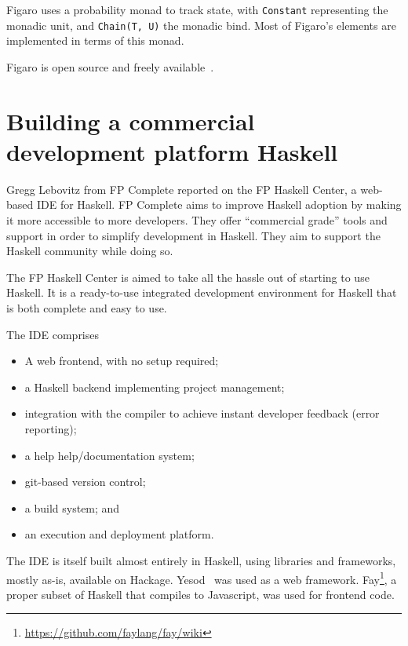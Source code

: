 \documentclass{jfp1}
\begin{document}
Figaro uses a probability monad to track state, with \texttt{Constant}
representing the monadic unit, and \texttt{Chain(T, U)} the monadic
bind. Most of Figaro's elements are implemented in terms of this monad.

Figaro is open source and freely available~\cite{CRA:2014:Figaro}.

\section{Building a commercial development platform Haskell}


Gregg Lebovitz from FP Complete reported on the FP Haskell Center, 
a web-based IDE for Haskell.  FP Complete aims to improve Haskell
adoption by making it more accessible to more developers. They offer
``commercial grade'' tools and support in order to simplify development
in Haskell. They aim to support the Haskell community while doing so.

The FP Haskell Center is aimed to take all the hassle out of starting to
use Haskell. It is a ready-to-use integrated development environment
for Haskell that is both complete and easy to use.

The IDE comprises

\begin{itemize}

\item A web frontend, with no setup required;

\item a Haskell backend implementing project management;

\item integration with the compiler to achieve instant developer
feedback (error reporting); 

\item a help help/documentation system;

\item git-based version control;

\item a build system; and

\item an execution and deployment platform.

\end{itemize}

The IDE is itself built almost entirely in Haskell, using libraries
and frameworks, mostly as-is, available on Hackage.
Yesod~\cite{Snoyman:2012:Developing} was used as a web framework.
Fay\footnote{\url{https://github.com/faylang/fay/wiki}}, a proper subset of Haskell that compiles to Javascript,
was used for frontend code.
\end{document}
